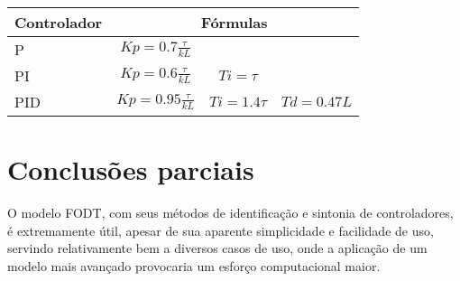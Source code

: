 
        \begin{center}
            \begin{tabular}{l*{3}{c}}
            \label{table_cap3_4}
Controlador & \multicolumn{3}{c}{Fórmulas} \\
\hline
P   & $Kp = 0.7\frac{\tau}{kL}$     &              & \\
PI  & $Kp = 0.6\frac{\tau}{kL}$ & $Ti = \tau$ & \\
PID & $Kp = 0.95\frac{\tau}{kL}$ & $Ti = 1.4\tau$ & $Td = 0.47L$ \\
            \end{tabular}
        \end{center}

\section{Conclusões parciais}

    O modelo \acs{FODT}, com seus métodos de identificação e sintonia de
    controladores, é extremamente útil, apesar de sua aparente simplicidade e
    facilidade de uso, servindo relativamente bem a diversos casos de uso, onde
    a aplicação de um modelo mais avançado provocaria um esforço computacional maior.
